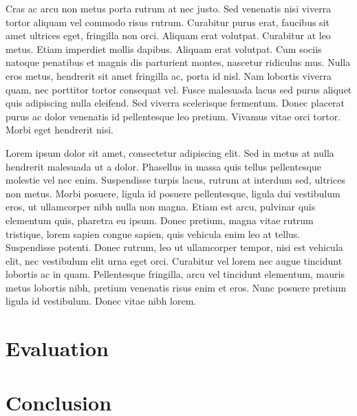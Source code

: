 \documentclass[12pt,twoside,notitlepage]{report}
\begin{document}
Cras ac arcu non metus porta rutrum at nec justo. Sed venenatis nisi viverra tortor aliquam vel commodo risus rutrum. Curabitur purus erat, faucibus sit amet ultrices eget, fringilla non orci. Aliquam erat volutpat. Curabitur at leo metus. Etiam imperdiet mollis dapibus. Aliquam erat volutpat. Cum sociis natoque penatibus et magnis dis parturient montes, nascetur ridiculus mus. Nulla eros metus, hendrerit sit amet fringilla ac, porta id nisl. Nam lobortis viverra quam, nec porttitor tortor consequat vel. Fusce malesuada lacus sed purus aliquet quis adipiscing nulla eleifend. Sed viverra scelerisque fermentum. Donec placerat purus ac dolor venenatis id pellentesque leo pretium. Vivamus vitae orci tortor. Morbi eget hendrerit nisi.

Lorem ipsum dolor sit amet, consectetur adipiscing elit. Sed in metus at nulla hendrerit malesuada ut a dolor. Phasellus in massa quis tellus pellentesque molestie vel nec enim. Suspendisse turpis lacus, rutrum at interdum sed, ultrices non metus. Morbi posuere, ligula id posuere pellentesque, ligula dui vestibulum eros, ut ullamcorper nibh nulla non magna. Etiam est arcu, pulvinar quis elementum quis, pharetra eu ipsum. Donec pretium, magna vitae rutrum tristique, lorem sapien congue sapien, quis vehicula enim leo at tellus. Suspendisse potenti. Donec rutrum, leo ut ullamcorper tempor, nisi est vehicula elit, nec vestibulum elit urna eget orci. Curabitur vel lorem nec augue tincidunt lobortis ac in quam. Pellentesque fringilla, arcu vel tincidunt elementum, mauris metus lobortis nibh, pretium venenatis risus enim et eros. Nunc posuere pretium ligula id vestibulum. Donec vitae nibh lorem.

\cleardoublepage
\chapter{Evaluation}


\cleardoublepage
\chapter{Conclusion}



\cleardoublepage



\cleardoublepage

\appendix
\end{document}

